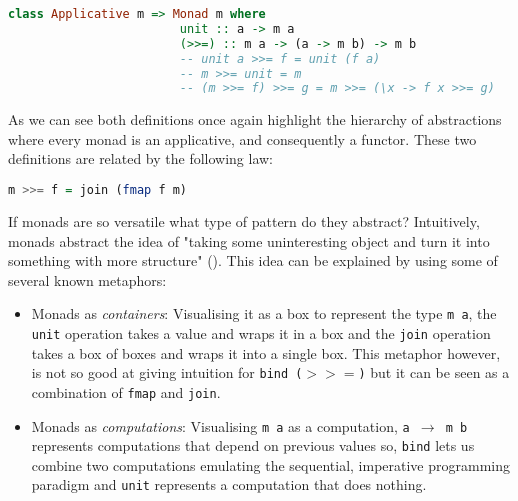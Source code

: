 \documentclass[
  oneside,
  11pt, a4paper,
  footinclude=true,
  headinclude=true,
  cleardoublepage=empty
]{scrbook}
\theoremstyle{definition}
\theoremstyle{definition}
\begin{document}
	            \begin{lstlisting}[mathescape, language=Haskell, caption={Monad laws and definition in terms of \texttt{unit} and \texttt{bind}},captionpos=b]
	                class Applicative m => Monad m where
	                    unit :: a -> m a
	                    (>>=) :: m a -> (a -> m b) -> m b
	                    -- unit a >>= f = unit (f a)
	                    -- m >>= unit = m
	                    -- (m >>= f) >>= g = m >>= (\x -> f x >>= g)
	            \end{lstlisting}{}
	            
	            As we can see both definitions once again highlight the hierarchy of abstractions where every monad is an applicative, and consequently a functor. These two definitions are related by the following law:
	            
	            \begin{lstlisting}[mathescape, language=Haskell, caption={Relation between \texttt{join} and \texttt{bind}},captionpos=b]
	                    m >>= f = join (fmap f m) 
	            \end{lstlisting}{}
	            
	            If monads are so versatile what type of pattern do they abstract? Intuitively, monads abstract the idea of "taking some uninteresting object and turn it into something with more structure" (\cite{DBLP:journals/corr/abs-1803-10195}). This idea can be explained by using some of several known metaphors:
	            
	            \begin{itemize}
	                \item Monads as \emph{containers}: Visualising it as a box to represent the type \texttt{m a}, the \texttt{unit} operation takes a value and wraps it in a box and the \texttt{join} operation takes a box of boxes and wraps it into a single box. This metaphor however, is not so good at giving intuition for \texttt{bind ($>>=$)} but it can be seen as a combination of \texttt{fmap} and \texttt{join}.
	                
	                \item Monads as \emph{computations}: Visualising \texttt{m a} as a computation, \texttt{a $\rightarrow$ m b} represents computations that depend on previous values so, \texttt{bind} lets us combine two computations emulating the sequential, imperative programming paradigm and \texttt{unit} represents a computation that does nothing.
	            \end{itemize}{}
	            
\end{document}
